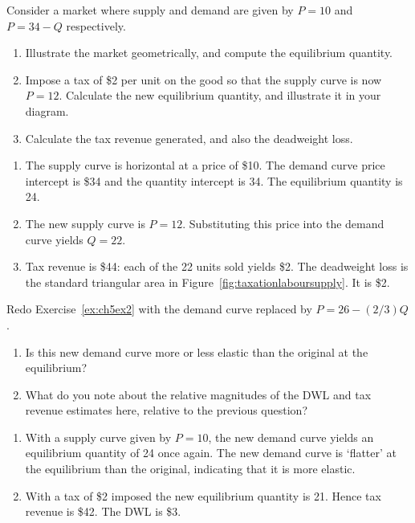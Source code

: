 \begin{enumialphparenastyle}
\begin{ex}\label{ex:ch5ex2}
Consider a market where supply and demand are given by $P=10$ and $P=34-Q$ respectively.
\begin{enumerate}
	\item	Illustrate the market geometrically, and compute the equilibrium quantity.
	\item	Impose a tax of \$2 per unit on the good so that the supply curve is now $P=12$. Calculate the new equilibrium quantity, and illustrate it in your diagram.
	\item	Calculate the tax revenue generated, and also the deadweight loss.
\end{enumerate}
\begin{sol}
\begin{enumerate}
	\item	The supply curve is horizontal at a price of \$10. The demand curve price intercept is \$34 and the quantity intercept is 34. The	equilibrium quantity is 24.
	\item	The new supply curve is $P=12$. Substituting this price into the demand curve yields $Q=22$.
	\item	Tax revenue is \$44: each of the 22 units sold yields \$2. The deadweight loss is the standard triangular area in Figure~\ref{fig:taxationlaboursupply}. It is \$2.
\end{enumerate}
\end{sol}
\end{ex}

\begin{ex}\label{ex:ch5ex3}
Redo Exercise~\ref{ex:ch5ex2} with the demand curve replaced by $P=26-(2/3)Q$.
\begin{enumerate}
	\item	Is this new demand curve more or less elastic than the original at the equilibrium?
	\item	What do you note about the relative magnitudes of the DWL and tax revenue estimates here, relative to the previous question?
\end{enumerate}
\begin{sol}
\begin{enumerate}
	\item	With a supply curve given by $P=10$, the new demand curve yields an equilibrium quantity of 24 once again. The new demand curve is `flatter' at the equilibrium than the original, indicating that it is more elastic.
	\item	With a tax of \$2 imposed the new equilibrium quantity is 21. Hence tax revenue is \$42. The DWL is \$3.
\end{enumerate}
\end{sol}
\end{ex}


\end{enumialphparenastyle}
